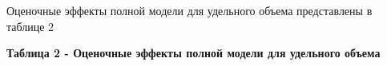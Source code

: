 
Оценочные эффекты полной модели для удельного объема представлены в
таблице 2

{\bfseries Таблица 2 - Оценочные эффекты полной модели для удельного
объема}


